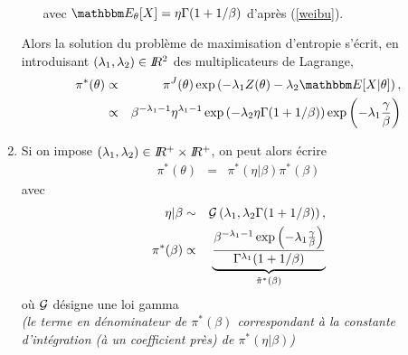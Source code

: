 \begin{enumerate}
\begin{enumerate}
\begin{eqnarray}
\end{eqnarray}
avec $\E_{\theta}[X]=\eta\Gamma(1+1/\beta)$ d'après (\ref{weibu}). 
\end{enumerate}
Alors la solution du problème de maximisation d'entropie s'écrit, en introduisant $(\lambda_1,\lambda_2)\in I\!\!R^2$ des multiplicateurs de Lagrange,
\begin{eqnarray*}
\pi^*(\theta) & \propto & \pi^J(\theta) \exp\left(-\lambda_1 Z(\theta) - \lambda_2\E[X|\theta]\right), \\
& \propto &  \beta^{-\lambda_1-1} \eta^{\lambda_1-1} \exp\left(-\lambda_2 \eta\Gamma(1+1/\beta)\right) \exp\left(-\lambda_1 \frac{\gamma}{\beta}\right)
\end{eqnarray*}
\item Si on impose $(\lambda_1,\lambda_2)\in I\!\!R^+\times I\!\!R^+$, on peut alors écrire
\begin{eqnarray*}
\pi^*(\theta) & = & \pi^*(\eta|\beta)\pi^*(\beta)
\end{eqnarray*}
avec
\begin{eqnarray*}
\eta|\beta & \sim & {\cal{G}}\left(\lambda_1,\lambda_2 \Gamma(1+1/\beta)\right), \\
\pi^*(\beta) & \propto & \underbrace{\frac{\beta^{-\lambda_1-1}\exp\left(-\lambda_1 \frac{\gamma}{\beta}\right)}{\Gamma^{\lambda_1}(1+1/\beta)}}_{\tilde{\pi}^*(\beta)}
\end{eqnarray*}
où ${\cal{G}}$ désigne une loi gamma \\
{\it (le terme en dénominateur de $\pi^*(\beta)$ correspondant à la constante d'intégration (à un coefficient près) de $\pi^*(\eta|\beta)$)}


\end{enumerate}
